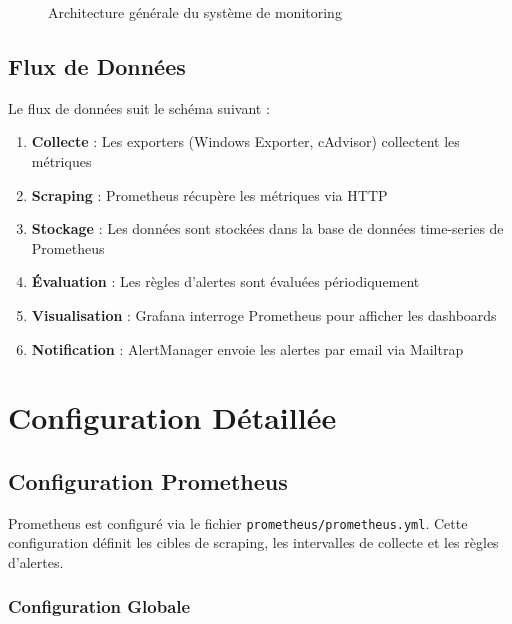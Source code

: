 \documentclass[12pt,a4paper]{report}
\newcommand{\file}[1]{\texttt{\color{secondaryblue}#1}}
\begin{document}
\begin{figure}[H]
\caption{Architecture générale du système de monitoring}
\label{fig:architecture}
\end{figure}

\section{Flux de Données}

Le flux de données suit le schéma suivant :

\begin{enumerate}
    \item \textbf{Collecte} : Les exporters (Windows Exporter, cAdvisor) collectent les métriques
    \item \textbf{Scraping} : Prometheus récupère les métriques via HTTP
    \item \textbf{Stockage} : Les données sont stockées dans la base de données time-series de Prometheus
    \item \textbf{Évaluation} : Les règles d'alertes sont évaluées périodiquement
    \item \textbf{Visualisation} : Grafana interroge Prometheus pour afficher les dashboards
    \item \textbf{Notification} : AlertManager envoie les alertes par email via Mailtrap
\end{enumerate}

\chapter{Configuration Détaillée}

\section{Configuration Prometheus}

Prometheus est configuré via le fichier \file{prometheus/prometheus.yml}. Cette configuration définit les cibles de scraping, les intervalles de collecte et les règles d'alertes.

\subsection{Configuration Globale}
\end{document}
